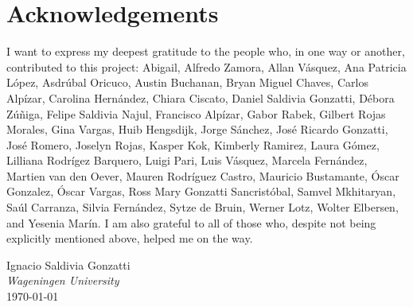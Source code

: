\chapter*{Acknowledgements}
\noindent

I want to express my deepest gratitude to the people who, in one way or another, contributed to this project: Abigail, Alfredo Zamora, Allan Vásquez, Ana Patricia López, Asdrúbal Oricuco, Austin Buchanan, Bryan Miguel Chaves, Carlos Alpízar, Carolina Hernández, Chiara Ciscato, Daniel Saldivia Gonzatti, Débora Zúñiga, Felipe Saldivia Najul, Francisco Alpízar, Gabor Rabek, Gilbert Rojas Morales, Gina Vargas, Huib Hengsdijk, Jorge Sánchez, José Ricardo Gonzatti, José Romero, Joselyn Rojas, Kasper Kok, Kimberly Ramirez, Laura Gómez, Lilliana Rodrígez Barquero, Luigi Pari, Luis Vásquez, Marcela Fernández, Martien van den Oever, Mauren Rodríguez Castro, Mauricio Bustamante, Óscar Gonzalez, Óscar Vargas, Ross Mary Gonzatti Sancristóbal, Samvel Mkhitaryan, Saúl Carranza, Silvia Fernández, Sytze de Bruin, Werner Lotz, Wolter Elbersen, and Yesenia Marín. I am also grateful to all of those who, despite not being explicitly mentioned above, helped me on the way. 


\vspace{2em}
\noindent
Ignacio Saldivia Gonzatti \\
\emph{Wageningen University} \\
\today